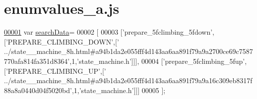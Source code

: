 \hypertarget{enumvalues__a_8js_source}{}\section{enumvalues\+\_\+a.\+js}
\label{enumvalues__a_8js_source}

\begin{DoxyCode}
\hypertarget{enumvalues__a_8js_source.tex_l00001}{}\hyperlink{enumvalues__a_8js_ad01a7523f103d6242ef9b0451861231e}{00001} var \hyperlink{enumvalues__a_8js_ad01a7523f103d6242ef9b0451861231e}{searchData}=
00002 [
00003   [\textcolor{stringliteral}{'prepare\_5fclimbing\_5fdown'},[\textcolor{stringliteral}{'PREPARE\_CLIMBING\_DOWN'},[\textcolor{stringliteral}{'
      ../state\_\_machine\_8h.html#a94b1da2e055fff4d143aa6aa891f79a9a2700ce69c7587770afa814fa351d8364'},1,\textcolor{stringliteral}{'state\_machine.h'}]]],
00004   [\textcolor{stringliteral}{'prepare\_5fclimbing\_5fup'},[\textcolor{stringliteral}{'PREPARE\_CLIMBING\_UP'},[\textcolor{stringliteral}{'
      ../state\_\_machine\_8h.html#a94b1da2e055fff4d143aa6aa891f79a9a16c309eb8317f88a8a0440d04f5020bd'},1,\textcolor{stringliteral}{'state\_machine.h'}]]]
00005 ];
\end{DoxyCode}
